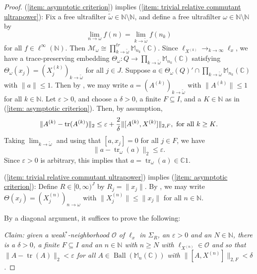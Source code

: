 \documentclass[10pt]{amsart}
\theoremstyle{definition}
\numberwithin{equation}{section}
\newcommand{\bC}{{\mathbb C}}
\newcommand{\bM}{{\mathbb M}}
\newcommand{\bN}{{\mathbb N}}
\newcommand{\cM}{{\mathcal M}}
\DeclareMathOperator{\tr}{tr}
\DeclareMathOperator{\Ball}{Ball}
\begin{document}
\begin{proof}
(\ref{item: asymptotic criterion}) implies (\ref{item: trivial relative commutant ultrapower}): Fix a free ultrafilter $\widetilde{\omega}\in \bN\setminus \bN$, and define a free ultrafilter $\omega\in \bN\setminus\bN$ by
\[\lim_{n\to\omega}f(n)=\lim_{k\to\widetilde{\omega}}f(n_{k})\]
for all $f\in \ell^{\infty}(\bN)$. Then $\cM_{\omega}\cong \prod_{k\to\widetilde{\omega}}^{tr}\bM_{n_{k}}(\bC)$. Since $\ell_{X^{(k)}}\to_{k\to\infty}\ell_{x}$, we have a trace-preserving embedding $\Theta_{\omega}\colon Q\to \prod_{k\to\widetilde{\omega}}\bM_{n_{k}}(\bC)$ satisfying $\Theta_{\omega}(x_{j})=(X^{(k)}_{j})_{k\to\widetilde{\omega}}$ for all $j\in J$. Suppose $a\in \Theta_{\omega}(Q)'\cap \prod_{k\to\widetilde{\omega}}\bM_{n_{k}}(\bC)$  with $\|a\|\leq 1$. Then by \cite[Proposition II.5.1.5]{BlackadarOA}, we may write $a=(A^{(k)})_{k\to\widetilde{\omega}}$ with $\|A^{(k)}\|\leq 1$ for all $k\in \bN$. Let $\varepsilon>0$, and choose a $\delta>0$, a finite $F\subseteq I$, and a $K\in \bN$ as in (\ref{item: asymptotic criterion}). Then, by assumption,
\[\|A^{(k)}-\tr(A^{(k)})\|_{2}\leq \varepsilon+\frac{2}{\delta}\|[A^{(k)},X^{(k)}]\|_{2,F}, \textnormal{ for all $k\geq K$}.\]
Taking $\lim_{k\to\widetilde{\omega}}$ and using that $[a,x_{j}]=0$ for all $j\in F$, we have 
\[\|a-\tr_{\omega}(a)\|_{2}\leq \varepsilon.\]
Since $\varepsilon>0$ is arbitrary, this implies that $a=\tr_{\omega}(a)\in \bC1$.

(\ref{item: trivial relative commutant ultrapower}) implies (\ref{item: asymptotic criterion}):  Define $R\in [0,\infty)^{J}$ by $R_{j}=\|x_{j}\|$. By \cite[Proposition II.5.1.5]{BlackadarOA}, we may write $\Theta(x_{j})=(X^{(n)}_{j})_{n\to\omega}$ with $\|X^{(n)}_{j}\|\leq \|x_{j}\|$ for all $n\in \bN$. 

By a diagonal argument, it suffices to prove the following:


\emph{Claim: given a weak$^{*}$-neighborhood $\mathcal{O}$ of $\ell_{x}$ in $\Sigma_{R}$, an $\varepsilon>0$ and an $N\in \bN$, there is a $\delta>0$, a finite $F\subseteq I$ and an $n\in \bN$ with $n\geq N$ with $\ell_{X^{(n)}}\in \mathcal{O}$ and so that  $\|A-\tr(A)\|_{2}<\varepsilon$ for all $A\in \Ball(\bM_{n}(\bC))$ with $\|[A,X^{(n)}]\|_{2,F}<\delta$.}


\end{proof}
\end{document}
